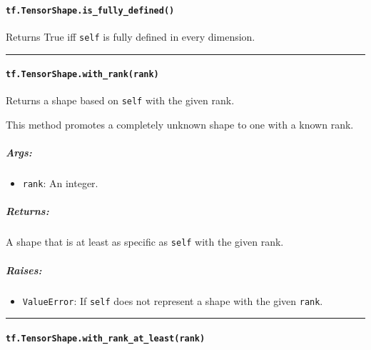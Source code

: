 \paragraph{\texorpdfstring{\lstinline{tf.TensorShape.is_fully_defined()}
}{tf.TensorShape.is_fully_defined() }}\label{tf.tensorshape.isux5ffullyux5fdefined}

Returns True iff \lstinline{self} is fully defined in every dimension.

\begin{center}\rule{0.5\linewidth}{\linethickness}\end{center}

\paragraph{\texorpdfstring{\lstinline{tf.TensorShape.with_rank(rank)}
}{tf.TensorShape.with_rank(rank) }}\label{tf.tensorshape.withux5frankrank}

Returns a shape based on \lstinline{self} with the given rank.

This method promotes a completely unknown shape to one with a known
rank.

\subparagraph{Args: }\label{args-33}

\begin{itemize}
\tightlist
\item
  \lstinline{rank}: An integer.
\end{itemize}

\subparagraph{Returns: }\label{returns-34}

A shape that is at least as specific as \lstinline{self} with the given
rank.

\subparagraph{Raises: }\label{raises-18}

\begin{itemize}
\tightlist
\item
  \lstinline{ValueError}: If \lstinline{self} does not represent a shape with
  the given \lstinline{rank}.
\end{itemize}

\begin{center}\rule{0.5\linewidth}{\linethickness}\end{center}

\paragraph{\texorpdfstring{\lstinline{tf.TensorShape.with_rank_at_least(rank)}
}{tf.TensorShape.with_rank_at_least(rank) }}\label{tf.tensorshape.withux5frankux5fatux5fleastrank}

